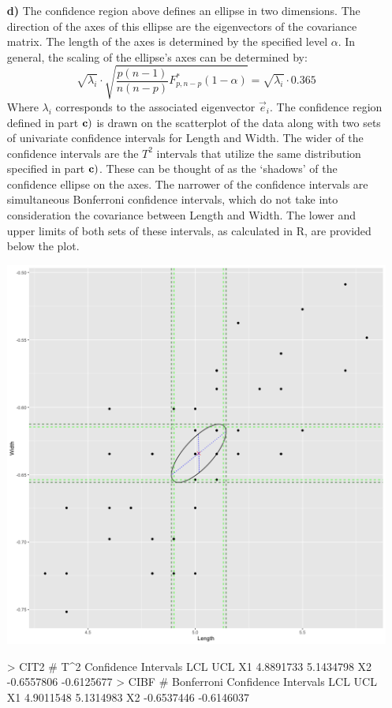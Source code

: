 \begin{enumerate}
\item[\bf{d)}]
	The confidence region above defines an ellipse in two dimensions. The direction of the axes of this ellipse are the eigenvectors of the covariance matrix. The length of the axes is determined by the specified level $\alpha$. In general, the scaling of the ellipse's axes can be determined by: $$\sqrt{\lambda_i} \cdot \sqrt{\frac{p(n-1)}{n(n-p)}F_{p, n-p}^*(1-\alpha)}=\sqrt{\lambda_i} \cdot 0.365$$ Where $\lambda_i$ corresponds to the associated eigenvector $\vec{e}_i$. The confidence region defined in part $\bf{c)}$ is drawn on the scatterplot of the data along with two sets of univariate confidence intervals for Length and Width. The wider of the confidence intervals are the $T^2$ intervals that utilize the same distribution specified in part $\bf{c)}$. These can be thought of as the `shadows' of the confidence ellipse on the axes. The narrower of the confidence intervals are simultaneous Bonferroni confidence intervals, which do not take into consideration the covariance between Length and Width. The lower and upper limits of both sets of these intervals, as calculated in R, are provided below the plot.
	\begin{center}
		\includegraphics[width=6in]{plot_4_d_conf.png}
	\end{center}
	\begin{rc}
	> CIT2 # T^2 Confidence Intervals
						LCL        UCL
	X1  4.8891733  5.1434798
	X2 -0.6557806 -0.6125677
	> CIBF # Bonferroni Confidence Intervals
						LCL        UCL
	X1  4.9011548  5.1314983
	X2 -0.6537446 -0.6146037
	\end{rc}

\end{enumerate}

